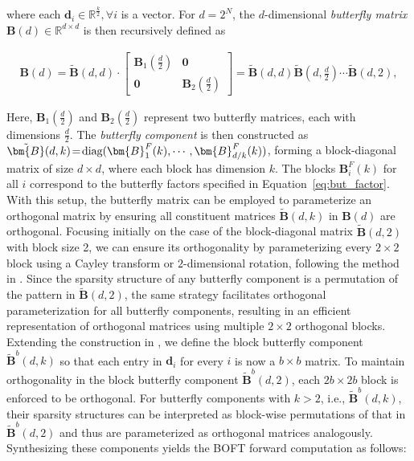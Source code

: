 where each $\bm{d}_i\in\mathbb{R}^{\frac{k}{2}},\forall i$ is a vector. For $d=2^N$, the $d$-dimensional \emph{butterfly matrix} $\bm{B}(d)\in\mathbb{R}^{d\times d}$ is then recursively defined as

\begin{equation}
\begin{aligned}
    \!\!\bm{B}(d)=\tilde{\bm{B}}(d,d)\!\cdot\!\begin{bmatrix}
    \bm{B}_1(\frac{d}{2})\!\!\!\!\! & \bm{0} \\
    \bm{0}\!\!\!\!\! &\bm{B}_2(\frac{d}{2})
    \end{bmatrix}= \tilde{\bm{B}}(d,d)\tilde{\bm{B}}(d,\frac{d}{2})\cdots\tilde{\bm{B}}(d,2),
\end{aligned}
\end{equation}

Here, $\bm{B}_1(\frac{d}{2})$ and $\bm{B}_2(\frac{d}{2})$ represent two butterfly matrices, each with dimensions $\frac{d}{2}$. The \emph{butterfly component} is then constructed as $\thickmuskip=2mu \medmuskip=2mu \tilde{\bm{B}}(d,k)=\text{diag}(\bm{B}^F_1(k),\cdots,\bm{B}^F_{d/k}(k))$, forming a block-diagonal matrix of size $d \times d$, where each block has dimension $k$. The blocks $\bm{B}^F_i(k)$ for all $i$ correspond to the butterfly factors specified in Equation~\ref{eq:but_factor}. With this setup, the butterfly matrix can be employed to parameterize an orthogonal matrix by ensuring all constituent matrices $\tilde{\bm{B}}(d,k)$ in $\bm{B}(d)$ are orthogonal. Focusing initially on the case of the block-diagonal matrix $\tilde{\bm{B}}(d,2)$ with block size 2, we can ensure its orthogonality by parameterizing every $2 \times 2$ block using a Cayley transform or $2$-dimensional rotation, following the method in \cite{liu2021orthogonal,qiu2023controlling}. Since the sparsity structure of any butterfly component is a permutation of the pattern in $\tilde{\bm{B}}(d,2)$, the same strategy facilitates orthogonal parameterization for all butterfly components, resulting in an efficient representation of orthogonal matrices using multiple $2\times 2$ orthogonal blocks. Extending the construction in \cite{chen2022pixelated}, we define the block butterfly component $\tilde{\bm{B}}^b(d,k)$ so that each entry in $\bm{d}_i$ for every $i$ is now a $b\times b$ matrix. To maintain orthogonality in the block butterfly component $\tilde{\bm{B}}^b(d,2)$, each $2b\times 2b$ block is enforced to be orthogonal. For butterfly components with $k>2$, i.e., $\tilde{\bm{B}}^b(d,k)$, their sparsity structures can be interpreted as block-wise permutations of that in $\tilde{\bm{B}}^b(d,2)$ and thus are parameterized as orthogonal matrices analogously. Synthesizing these components yields the BOFT forward computation as follows:

